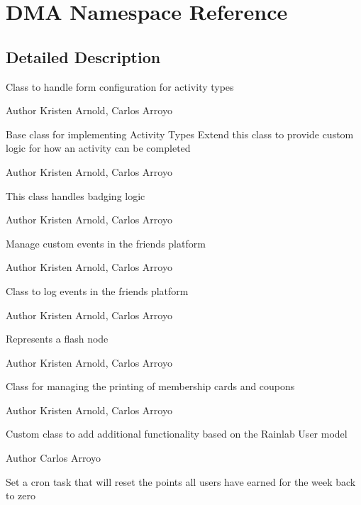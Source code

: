 \hypertarget{namespaceDMA}{}\section{D\+M\+A Namespace Reference}
\label{namespaceDMA}


\subsection{Detailed Description}
Class to handle form configuration for activity types

\begin{DoxyAuthor}{Author}
Kristen Arnold, Carlos Arroyo
\end{DoxyAuthor}
Base class for implementing Activity Types Extend this class to provide custom logic for how an activity can be completed

\begin{DoxyAuthor}{Author}
Kristen Arnold, Carlos Arroyo
\end{DoxyAuthor}
This class handles badging logic

\begin{DoxyAuthor}{Author}
Kristen Arnold, Carlos Arroyo
\end{DoxyAuthor}
Manage custom events in the friends platform

\begin{DoxyAuthor}{Author}
Kristen Arnold, Carlos Arroyo
\end{DoxyAuthor}
Class to log events in the friends platform

\begin{DoxyAuthor}{Author}
Kristen Arnold, Carlos Arroyo
\end{DoxyAuthor}
Represents a flash node

\begin{DoxyAuthor}{Author}
Kristen Arnold, Carlos Arroyo
\end{DoxyAuthor}
Class for managing the printing of membership cards and coupons  \begin{DoxyAuthor}{Author}
Kristen Arnold, Carlos Arroyo
\end{DoxyAuthor}
Custom class to add additional functionality based on the Rainlab User model

\begin{DoxyAuthor}{Author}
Carlos Arroyo
\end{DoxyAuthor}
Set a cron task that will reset the points all users have earned for the week back to zero

